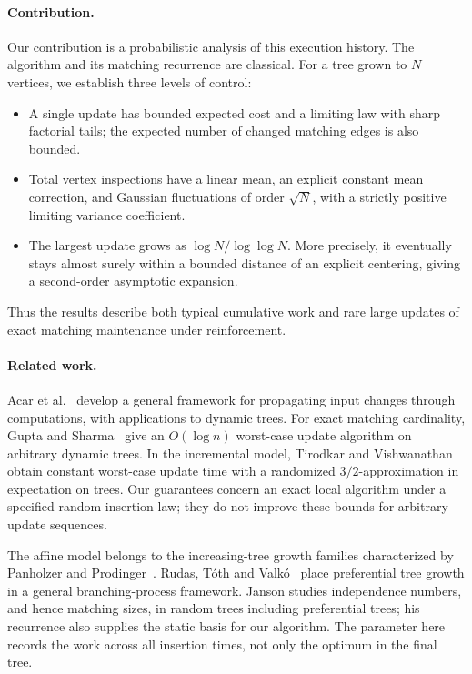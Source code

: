 \documentclass[runningheads,envcountsame,orivec]{llncs}
\begin{document}
\paragraph{Contribution.}
Our contribution is a probabilistic analysis of this execution history.
The algorithm and its matching recurrence are classical.
For a tree grown to $N$ vertices, we establish three levels of control:
\begin{itemize}
\item A single update has bounded expected cost and a limiting law with
sharp factorial tails; the expected number of changed matching edges
is also bounded.
\item Total vertex inspections have a linear mean, an explicit constant
mean correction, and Gaussian fluctuations of order $\sqrt N$, with
a strictly positive limiting variance coefficient.
\item The largest update grows as $\log N/\log\log N$. More precisely,
it eventually stays almost surely within a bounded distance of an
explicit centering, giving a second-order asymptotic expansion.
\end{itemize}
Thus the results describe both typical cumulative work and rare large
updates of exact matching maintenance under reinforcement.

\paragraph{Related work.}
Acar et al.~\cite{AcarEtAl2004} develop a general framework for
propagating input changes through computations, with applications to
dynamic trees. For exact matching cardinality, Gupta and
Sharma~\cite{GuptaSharma2009} give an $O(\log n)$ worst-case update
algorithm on arbitrary dynamic trees. In the incremental model,
Tirodkar and Vishwanathan~\cite{TirodkarVishwanathan2019} obtain
constant worst-case update time with a randomized $3/2$-approximation
in expectation on trees. Our guarantees concern an exact local
algorithm under a specified random insertion law; they do not improve
these bounds for arbitrary update sequences.

The affine model belongs to the increasing-tree growth families
characterized by Panholzer and Prodinger~\cite{PanholzerProdinger2007}.
Rudas, T\'oth and Valk\'o~\cite{RudasTothValko2007} place preferential
tree growth in a general branching-process framework. Janson
\cite{Janson2020} studies independence numbers, and hence matching
sizes, in random trees including preferential trees; his recurrence
also supplies the static basis for our algorithm. The parameter here
records the work across all insertion times, not only the optimum in
the final tree.
\end{document}
